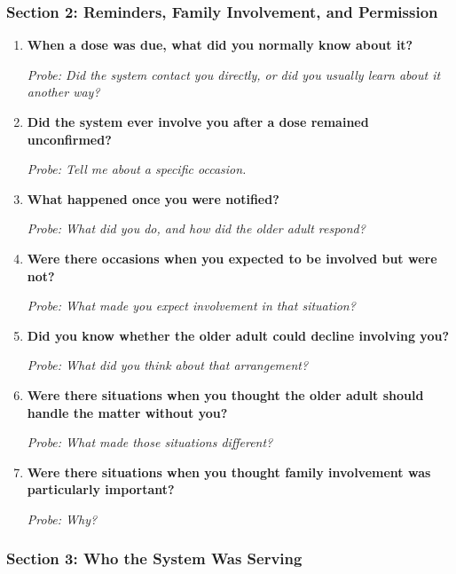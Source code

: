 \subsubsection{Section 2: Reminders, Family Involvement, and Permission}

\begin{enumerate}[resume]
  \item \textbf{When a dose was due, what did you normally know about it?}

  \textit{Probe: Did the system contact you directly, or did you usually learn about it another way?}
  \item \textbf{Did the system ever involve you after a dose remained unconfirmed?}

  \textit{Probe: Tell me about a specific occasion.}
  \item \textbf{What happened once you were notified?}

  \textit{Probe: What did you do, and how did the older adult respond?}
  \item \textbf{Were there occasions when you expected to be involved but were not?}

  \textit{Probe: What made you expect involvement in that situation?}
  \item \textbf{Did you know whether the older adult could decline involving you?}

  \textit{Probe: What did you think about that arrangement?}
  \item \textbf{Were there situations when you thought the older adult should handle the matter without you?}

  \textit{Probe: What made those situations different?}
  \item \textbf{Were there situations when you thought family involvement was particularly important?}

  \textit{Probe: Why?}
\end{enumerate}

\subsubsection{Section 3: Who the System Was Serving}

